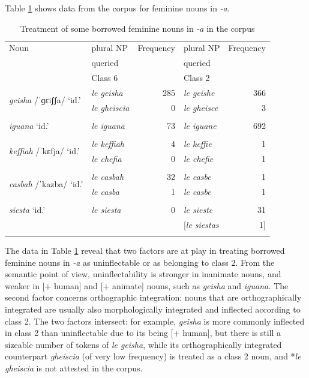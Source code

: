\documentclass[output=paper,colorlinks,citecolor=brown]{langscibook}
\begin{document}
Table \ref{10tab14} shows data from the  corpus for feminine nouns in \emph{-a}.

\begin{table}[ht]
	\centering
	\begin{tabularx}{0.9\textwidth}{lXrXr}
		\lsptoprule
			Noun & plural NP & Frequency & plural NP & Frequency \\
			& queried & & queried & \\
			& Class 6\is{inflectional class} & & Class 2 & \\
			\midrule
			\multirow{2}{2cm}{\emph{geisha} /ˈɡɛiʃʃa/ ‘id.’} & \emph{le geisha} & 285 & \emph{le geishe} & 366 \\
			& \emph{le gheiscia} & 0 & \emph{le gheisce} & 3 \\
			& & & & \\
			\emph{iguana} ‘id.’ & \emph{le iguana} & 73 & \emph{le iguane} & 692 \\
			& & & & \\
			\multirow{2}{2cm}{\emph{keffiah} /ˈkɛfja/ ‘id.’} & \emph{le keffiah}  & 4 & \emph{le keffie} & 1 \\
			& \emph{le chefia} & 0 & \emph{le chefie} & 1 \\
			& & & & \\
			\multirow{2}{2cm}{\emph{casbah} /ˈkazba/ ‘id.’} & \emph{le casbah} & 32 & \emph{le casbe} & 1 \\
			& \emph{le casba} & 1 & \emph{le casbe} & 1 \\
			& & & & \\
			\emph{siesta} ‘id.’ & \emph{le siesta} & 0 & \emph{le sieste} & 31 \\
			& & & [\emph{le siestas} & 1] \\
		\lspbottomrule
	\end{tabularx}
	\caption{Treatment of some borrowed feminine nouns in \emph{‑a} in the  corpus}
	\label{10tab14}
\end{table}

The data in Table \ref{10tab14} reveal that two factors are at play in treating borrowed feminine nouns in \emph{-a} as uninflectable or as belonging to class 2. From the semantic point of view, uninflectability is stronger in inanimate nouns, and weaker in [+ human] and [+ animate] nouns, such as \emph{geisha} and \emph{iguana.} The second factor concerns orthographic integration: nouns that are orthographically integrated are usually also morphologically integrated and inflected according to class 2. The two factors intersect: for example, \emph{geisha} is more commonly inflected in class 2 than uninflectable due to its being [+ human], but there is still a sizeable number of tokens of \emph{le geisha}, while its orthographically integrated counterpart \emph{gheiscia} (of very low frequency) is treated as a class 2 noun, and *\emph{le gheiscia} is not attested in the  corpus.
\end{document}
